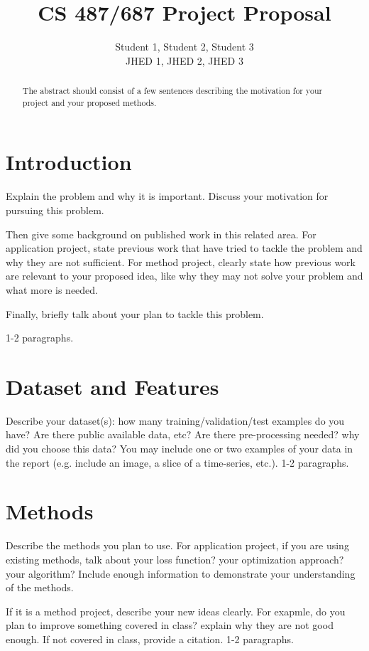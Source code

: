 \documentclass{article}
\title{CS 487/687 Project Proposal}
\author{
  Student 1, Student 2, Student 3\\
  JHED 1, JHED 2, JHED 3
}
\begin{document}
\maketitle

\begin{abstract}
The abstract should consist of a few sentences describing the motivation for your project and your proposed methods.

\end{abstract}

\section{Introduction}	
Explain the problem and why it is important. Discuss your motivation for pursuing this
problem. 

Then give some background on published work in this related area. For application project, state previous work that have tried to tackle the problem and why they are not sufficient. For method project, clearly state how previous work are relevant to your proposed idea, like why they may not solve your problem and what more is needed.

Finally, briefly talk about your plan to tackle this problem.

1-2 paragraphs.

\section{Dataset and Features}
Describe your dataset(s): how many training/validation/test examples do you have? Are there public available data, etc? Are there pre-processing needed? why did you choose this data?
You may include one or two examples of your data in the report
(e.g. include an image, a slice of a time-series, etc.). 1-2 paragraphs.

\section{Methods}
Describe the methods you plan to use. For application project, if you are using existing methods, talk about your loss function? your optimization approach? your algorithm? Include enough information to demonstrate your understanding of the methods. 

If it is a method project, describe your new ideas clearly. For exapmle, do you plan to improve something covered in class? explain why they are not good enough. If not covered in class, provide a citation. 1-2 paragraphs.
\end{document}
